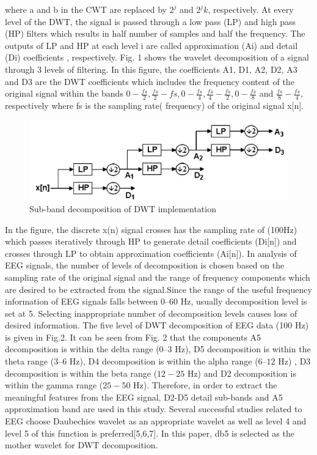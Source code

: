\documentclass[a4paper, 11pt]{article} %
\begin{document}
where a and b in the CWT are replaced by $2^j$ and $2^jk$, respectively.
At every level of the DWT, the signal is  passed through a low pass (LP) and high pass (HP) filters which results in half number of samples and half the frequency. The outputs of LP and HP at each level i are called approximation (Ai) and detail (Di) coefficients , respectively. Fig. 1 shows the wavelet decomposition of a signal through 3 levels of filtering. In this figure, the coefficients A1, D1, A2, D2, A3 and D3 are the DWT coefficients which includes the frequency content of the original signal within the
bands ${0-\frac{fs}{2}},{\frac{fs}{2}-fs}, {0-\frac{fs}{4}}, {\frac{fs}{4}-\frac{fs}{2}},{ 0-\frac{fs}{8}}$ and ${\frac{fs}{8}-\frac{fs}{4}}$, respectively where fs is the sampling rate( frequency) of the original signal x[n].\\
\begin{figure}

\includegraphics[width=1\textwidth]{graph.png}

\caption{Sub-band decomposition of DWT implementation}
\end{figure}
In the figure, the discrete x(n) signal crosses has the sampling rate of (100Hz) which passes iteratively through HP to generate detail coefficients (Di[n]) and crosses through LP to obtain approximation
coefficients (Ai[n]). In analysis of EEG signals, the number of levels of decomposition is chosen based on the sampling rate of the original signal and the range of frequency components which are desired to be extracted from the signal.Since the range of the useful frequency information of  EEG signals falls between $0–60$ Hz, usually decomposition level is set at 5. Selecting inappropriate number of decomposition levels causes loss of desired information.
The five level of DWT decomposition of EEG data (100 Hz) is given in Fig.2. It can be seen from Fig. 2 that the components A5 decomposition is within the delta range ($0–3$ Hz), D5 decomposition is within the theta range ($3–6$ Hz), D4 decomposition is within the alpha range ($6–12$ Hz) , D3 decomposition is within the beta range ($12-25$ Hz) and D2 decomposition is within the gamma range ($25-50$ Hz).  Therefore, in order to extract the meaningful features from the EEG signal, D2-D5 detail sub-bands and A5 approximation band are used in this study. Several successful studies related to EEG choose Daubechies wavelet as an appropriate wavelet as well as level 4 and level 5 of this function is preferred[5,6,7]. In this paper, db5 is selected as the mother wavelet for DWT decomposition. 
\end{document}
